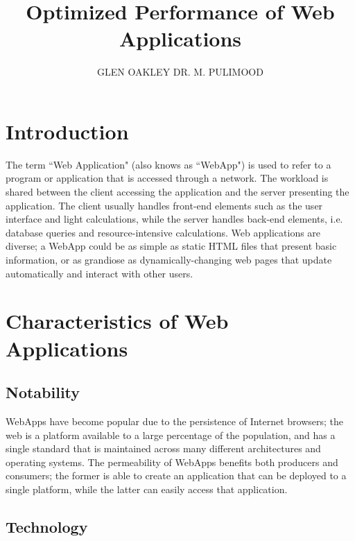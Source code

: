 \documentclass{acmsmall}
\title{Optimized Performance of Web Applications}
\author{GLEN OAKLEY \affil{CSC260-01, The College of New Jersey} DR. M. PULIMOOD \affil{Instructor}}
\begin{document}
\begin{bottomstuff}
\end{bottomstuff}

\maketitle{}

\section{Introduction}

The term ``Web Application" (also knows as ``WebApp") is used to refer to a program or application that is accessed through a network.  The workload is shared between the client accessing the application and the server presenting the application.  The client usually handles front-end elements such as the user interface and light calculations, while the server handles back-end elements, i.e. database queries and resource-intensive calculations.  Web applications are diverse; a WebApp could be as simple as static HTML files that present basic information, or as grandiose as dynamically-changing web pages that update automatically and interact with other users.\cite{pressman}

\section{Characteristics of Web Applications}

\subsection{Notability}

WebApps have become popular due to the persistence of Internet browsers; the web is a platform available to a large percentage of the population, and has a single standard that is maintained across many different architectures and operating systems.  The permeability of WebApps benefits both producers and consumers; the former is able to create an application that can be deployed to a single platform, while the latter can easily access that application.

\subsection{Technology}
\end{document}
